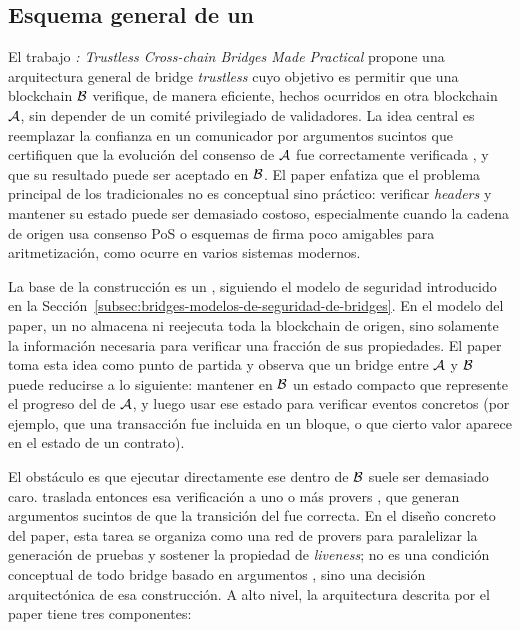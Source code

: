 
\subsection{Esquema general de un \zkBridge}
\label{subsec:zk-bridge-esquema-general-de-un-zkbridge}

El trabajo \textit{\zkBridge: Trustless Cross-chain Bridges Made Practical} \cite{Xie2022} propone una arquitectura general de bridge \emph{trustless} cuyo objetivo es permitir que una blockchain $\mathcal{B}$ verifique, de manera eficiente, hechos ocurridos en otra blockchain $\mathcal{A}$, sin depender de un comité privilegiado de validadores. La idea central es reemplazar la confianza en un comunicador por argumentos sucintos que certifiquen que la evolución del consenso de $\mathcal{A}$ fue correctamente verificada \Offchain, y que su resultado puede ser aceptado \Onchain en $\mathcal{B}$. El paper enfatiza que el problema principal de los \LightClients tradicionales no es conceptual sino práctico: verificar \textit{headers} y mantener su estado \Onchain puede ser demasiado costoso, especialmente cuando la cadena de origen usa consenso PoS o esquemas de firma poco amigables para aritmetización, como ocurre en varios sistemas modernos.

La base de la construcción es un \LightClientProtocol, siguiendo el modelo de seguridad introducido en la Sección~\ref{subsec:bridges-modelos-de-seguridad-de-bridges}. En el modelo del paper, un \LightClient no almacena ni reejecuta toda la blockchain de origen, sino solamente la información necesaria para verificar una fracción de sus propiedades. El paper toma esta idea como punto de partida y observa que un bridge entre $\mathcal{A}$ y $\mathcal{B}$ puede reducirse a lo siguiente: mantener en $\mathcal{B}$ un estado compacto que represente el progreso del \LightClient de $\mathcal{A}$, y luego usar ese estado para verificar eventos concretos (por ejemplo, que una transacción fue incluida en un bloque, o que cierto valor aparece en el estado de un contrato).

El obstáculo es que ejecutar directamente ese \LightClient dentro de $\mathcal{B}$ suele ser demasiado caro. \zkBridge traslada entonces esa verificación a uno o más provers \Offchain, que generan argumentos sucintos de que la transición del \LightClient fue correcta. En el diseño concreto del paper, esta tarea se organiza como una red de provers para paralelizar la generación de pruebas y sostener la propiedad de \emph{liveness}; no es una condición conceptual de todo bridge basado en argumentos \ZK, sino una decisión arquitectónica de esa construcción. A alto nivel, la arquitectura descrita por el paper tiene tres componentes:

